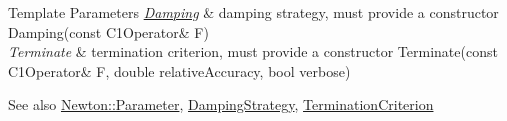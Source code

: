 \begin{DoxyTemplParams}{Template Parameters}
{\em \hyperlink{namespaceSpacy_1_1Newton_1_1Damping}{Damping}} & damping strategy, must provide a constructor Damping(const C1\+Operator\& F) \\
\hline
{\em Terminate} & termination criterion, must provide a constructor Terminate(const C1\+Operator\& F, double relative\+Accuracy, bool verbose)\\
\hline
\end{DoxyTemplParams}
\begin{DoxySeeAlso}{See also}
\hyperlink{structSpacy_1_1Newton_1_1Parameter}{Newton\+::\+Parameter}, \hyperlink{namespaceSpacy_1_1Newton_ae2ba8821b209bfac2ab9190e6283cf06_Newton_DampingStrategyAnchor}{Damping\+Strategy}, \hyperlink{namespaceSpacy_1_1Newton_abfa64b52531032d7a5fe6d0ec1a3cbd5_Newton_TerminationCriterionAnchor}{Termination\+Criterion} 
\end{DoxySeeAlso}
